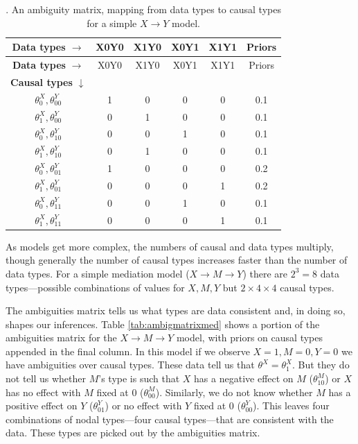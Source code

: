 \documentclass[
  12pt,
]{book}
\begin{document}
\begin{longtable}[]{@{}cccccc@{}}
\caption{\label{tab:ambigmatrix}. An ambiguity matrix, mapping from data types to causal types for a simple \(X \rightarrow Y\) model.}\tabularnewline
\toprule
\textbf{Data types} \(\rightarrow\) & X0Y0 & X1Y0 & X0Y1 & X1Y1 & Priors \\
\midrule
\endfirsthead
\toprule
\textbf{Data types} \(\rightarrow\) & X0Y0 & X1Y0 & X0Y1 & X1Y1 & Priors \\
\midrule
\endhead
\textbf{Causal types} \(\downarrow\) & & & & & \\
\(\theta^X_0,\theta^Y_{00}\) & 1 & 0 & 0 & 0 & 0.1 \\
\(\theta^X_1,\theta^Y_{00}\) & 0 & 1 & 0 & 0 & 0.1 \\
\(\theta^X_0,\theta^Y_{10}\) & 0 & 0 & 1 & 0 & 0.1 \\
\(\theta^X_1,\theta^Y_{10}\) & 0 & 1 & 0 & 0 & 0.1 \\
\(\theta^X_0,\theta^Y_{01}\) & 1 & 0 & 0 & 0 & 0.2 \\
\(\theta^X_1,\theta^Y_{01}\) & 0 & 0 & 0 & 1 & 0.2 \\
\(\theta^X_0,\theta^Y_{11}\) & 0 & 0 & 1 & 0 & 0.1 \\
\(\theta^X_1,\theta^Y_{11}\) & 0 & 0 & 0 & 1 & 0.1 \\
\bottomrule
\end{longtable}

As models get more complex, the numbers of causal and data types multiply, though generally the number of causal types increases faster than the number of data types. For a simple mediation model (\(X \rightarrow M \rightarrow Y\)) there are \(2^3 = 8\) data types---possible combinations of values for \(X,M,Y\) but \(2\times 4 \times 4\) causal types.

The ambiguities matrix tells us what types are data consistent and, in doing so, shapes our inferences.
Table \ref{tab:ambigmatrixmed} shows a portion of the ambiguities matrix for the \(X \rightarrow M \rightarrow Y\) model, with priors on causal types appended in the final column. In this model if we observe \(X=1, M=0, Y=0\) we have ambiguities over causal types. These data tell us that \(\theta^X = \theta^X_1\). But they do not tell us whether \(M\)'s type is such that \(X\) has a negative effect on \(M\) (\(\theta^M_{10}\)) or \(X\) has no effect with \(M\) fixed at \(0\) (\(\theta^M_{00}\)). Similarly, we do not know whether \(M\) has a positive effect on \(Y\) (\(\theta^Y_{01}\)) or no effect with \(Y\) fixed at \(0\) (\(\theta^Y_{00}\)). This leaves four combinations of nodal types---four causal types---that are consistent with the data. These types are picked out by the ambiguities matrix.
\end{document}
